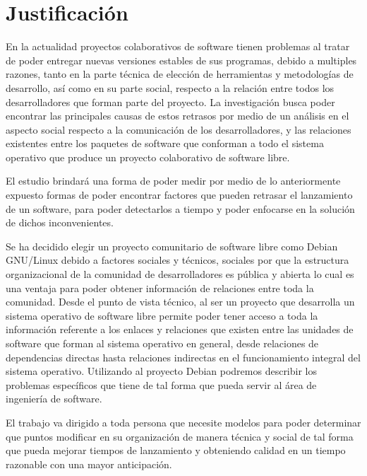 \documentclass[12pt]{report}
\begin{document}
\chapter*{Justificación} En  la actualidad proyectos  colaborativos de
software tienen problemas al tratar de poder entregar nuevas versiones
estables de  sus programas,  debido a multiples  razones, tanto  en la
parte  técnica   de  elección   de  herramientas  y   metodologías  de
desarrollo, así como en su parte  social, respecto a la relación entre
todos  los   desarrolladores  que  forman  parte   del  proyecto.   La
investigación busca  poder encontrar  las principales causas  de estos
retrasos por medio  de un análisis en el aspecto  social respecto a la
comunicación de los desarrolladores, y las relaciones existentes entre
los paquetes de software que conforman a todo el sistema operativo que
produce un proyecto colaborativo de software libre.

El  estudio  brindará  una  forma  de poder  medir  por  medio  de  lo
anteriormente expuesto  formas de poder encontrar  factores que pueden
retrasar  el lanzamiento  de  un software,  para  poder detectarlos  a
tiempo y poder enfocarse en la solución de dichos inconvenientes.

Se ha decidido  elegir un proyecto comunitario de  software libre como
Debian  GNU/Linux debido a factores sociales  y técnicos,  sociales
por que  la  estructura   organizacional  de  la  comunidad  de
desarrolladores es pública y abierta lo cual es una ventaja para poder
obtener información de  relaciones entre toda la  comunidad.  Desde el
punto de vista  técnico, al ser un proyecto que  desarrolla un sistema
operativo  de software  libre permite  poder  tener acceso  a toda  la
información referente a los enlaces y relaciones que existen entre las
unidades de software que forman al sistema operativo en general, desde
relaciones de dependencias directas  hasta relaciones indirectas en el
funcionamiento integral del sistema operativo. Utilizando al proyecto 
Debian podremos describir los problemas específicos que tiene de tal 
forma que pueda servir al área de ingeniería de software.

El trabajo va dirigido a toda  persona que necesite modelos para poder
determinar que puntos modificar en su organización de manera técnica y
social  de  tal forma  que  pueda  mejorar  tiempos de  lanzamiento  y
obteniendo calidad en un tiempo razonable con una mayor anticipación.
\end{document}
